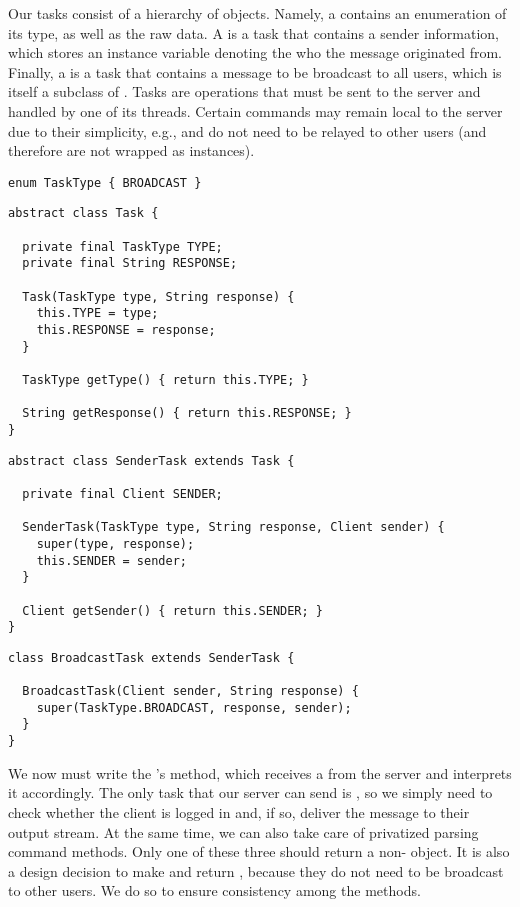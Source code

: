 Our tasks consist of a hierarchy of objects. 
Namely, a  contains an enumeration of its type, as well as the raw data. 
A  is a task that contains a sender information, which stores an instance variable denoting the  who the message originated from. 
Finally, a  is a task that contains a message to be broadcast to all users, which is itself a subclass of . 
Tasks are operations that must be sent to the server and handled by one of its threads. 
Certain commands may remain local to the server due to their simplicity, e.g.,  and  do not need to be relayed to other users (and therefore are not wrapped as  instances). 

\begin{lstlisting}[language=MyJava]
enum TaskType { BROADCAST }
\end{lstlisting}

\begin{lstlisting}[language=MyJava]
abstract class Task {

  private final TaskType TYPE;
  private final String RESPONSE;

  Task(TaskType type, String response) {
    this.TYPE = type;
    this.RESPONSE = response;
  }

  TaskType getType() { return this.TYPE; }

  String getResponse() { return this.RESPONSE; }
}
\end{lstlisting}

\begin{lstlisting}[language=MyJava]
abstract class SenderTask extends Task {

  private final Client SENDER;

  SenderTask(TaskType type, String response, Client sender) {
    super(type, response);
    this.SENDER = sender;
  }

  Client getSender() { return this.SENDER; }
}
\end{lstlisting}

\begin{lstlisting}[language=MyJava]
class BroadcastTask extends SenderTask {

  BroadcastTask(Client sender, String response) {
    super(TaskType.BROADCAST, response, sender);
  }
}
\end{lstlisting}

We now must write the 's  method, which receives a  from the server and interprets it accordingly. 
The only task that our server can send is , so we simply need to check whether the client is logged in and, if so, deliver the message to their output stream. 
At the same time, we can also take care of privatized parsing command methods. 
Only one of these three should return a non- object. 
It is also a design decision to make  and  return , because they do not need to be broadcast to other users. 
We do so to ensure consistency among the methods.

